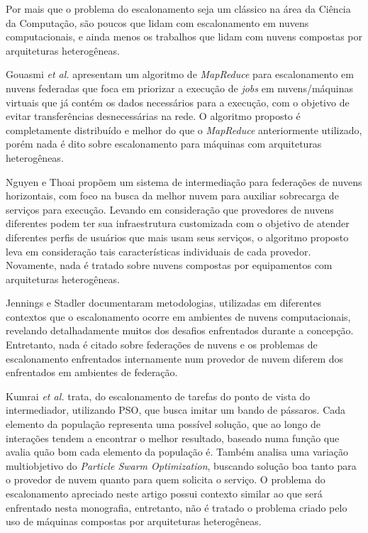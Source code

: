 Por mais que o problema do escalonamento seja um clássico na área da Ciência da Computação, são poucos que lidam com escalonamento em nuvens computacionais, e ainda menos os trabalhos que lidam com nuvens compostas por arquiteturas heterogêneas. 

Gouasmi \textit{et al.} \cite{MapReduce_sched_8034997} apresentam um algoritmo de \textit{MapReduce}\cite{Dean:2008:MSD:1327452.1327492} para escalonamento em nuvens federadas que foca em priorizar a execução de \textit{jobs} em nuvens/máquinas virtuais que já contém os dados necessários para a execução, com o objetivo de evitar transferências desnecessárias na rede. O algoritmo proposto é completamente distribuído e melhor do que o \textit{MapReduce} anteriormente utilizado, porém nada é dito sobre escalonamento para máquinas com arquiteturas heterogêneas.

Nguyen e Thoai \cite{7791859} propõem um sistema de intermediação para federações de nuvens horizontais, com foco na busca da melhor nuvem para auxiliar sobrecarga de serviços para execução. Levando em consideração que provedores de nuvens diferentes podem ter sua infraestrutura customizada com o objetivo de atender diferentes perfis de usuários que mais usam seus serviços, o algoritmo proposto leva em consideração tais características individuais de cada provedor. Novamente, nada é tratado sobre nuvens compostas por equipamentos com arquiteturas heterogêneas.

Jennings e Stadler \cite{Jennings:2015:RMC:2793474.2793493} documentaram  metodologias, utilizadas em diferentes contextos que o escalonamento ocorre em ambientes de nuvens computacionais, revelando detalhadamente muitos dos desafios enfrentados durante a concepção. Entretanto, nada é citado sobre federações de nuvens e os problemas de escalonamento enfrentados internamente num provedor de nuvem diferem dos enfrentados em ambientes de federação.

Kumrai \textit{et al.} \cite{7467407} trata, do escalonamento de tarefas do ponto de vista do intermediador, utilizando \acrfull{PSO}, que busca imitar um bando de pássaros. Cada elemento da população representa uma possível solução, que ao longo de interações tendem a encontrar o melhor resultado, baseado numa função que avalia quão bom cada elemento da população é. Também analisa uma variação multiobjetivo do \textit{Particle Swarm Optimization}, buscando solução boa tanto para o provedor de nuvem quanto para quem solicita o serviço. O problema do escalonamento apreciado neste artigo possui contexto similar ao que será enfrentado nesta monografia, entretanto, não é tratado o problema criado pelo uso de máquinas compostas por arquiteturas heterogêneas.

